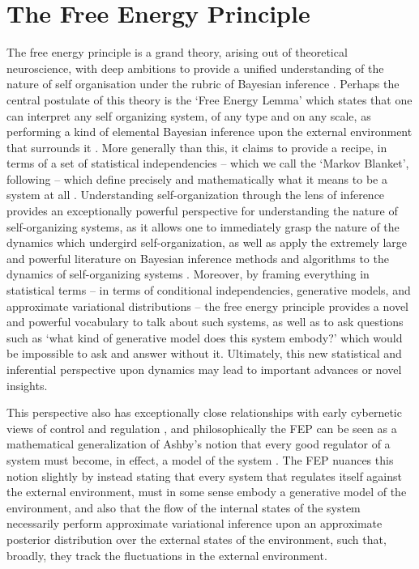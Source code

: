 
\chapter{The Free Energy Principle}

The free energy principle is a grand theory, arising out of theoretical neuroscience, with deep ambitions to provide a unified understanding of the nature of self organisation under the rubric of Bayesian inference \citep{friston2006free,friston_free_2019,friston2010free,friston2012free}. Perhaps the central postulate of this theory is the `Free Energy Lemma' which states that one can interpret any self organizing system, of any type and on any scale, as performing a kind of elemental Bayesian inference upon the external environment that surrounds it \citep{friston2013life,friston2012ao,friston2019particularphysics}. More generally than this, it claims to provide a recipe, in terms of a set of statistical independencies -- which we call the `Markov Blanket', following \citep{pearl2011Bayesian} -- which define precisely and mathematically what it means to be a system at all \citep{friston2019particularphysics}. Understanding self-organization through the lens of inference provides an exceptionally powerful perspective for understanding the nature of self-organizing systems, as it allows one to immediately grasp the nature of the dynamics which undergird self-organization, as well as apply the extremely large and powerful literature on Bayesian inference methods and algorithms to the dynamics of self-organizing systems \citep{parr2020modules,parr2020Markov,yedidia2011message}. 
Moreover, by framing everything in statistical terms -- in terms of conditional independencies, generative models, and approximate variational distributions -- the free energy principle provides a novel and powerful vocabulary to talk about such systems, as well as to ask questions such as `what kind of generative model does this system embody?' \citep{baltieri2020predictions, maturana2012autopoiesis} which would be impossible to ask and answer without it. Ultimately, this new statistical and inferential perspective upon dynamics may lead to important advances or novel insights.

This perspective also has exceptionally close relationships with early cybernetic views of control and regulation \citep{wiener2019cybernetics,conant1970every,kalman1960new}, and philosophically the FEP can be seen as a mathematical generalization of Ashby's notion that every good regulator of a system must become, in effect, a model of the system \citep{conant1970every}. The FEP nuances this notion slightly by instead stating that every system that regulates itself against the external environment, must in some sense embody a generative model of the environment, and also that the flow of the internal states of the system necessarily perform approximate variational inference upon an approximate posterior distribution over the external states of the environment, such that, broadly, they track the fluctuations in the external environment.

